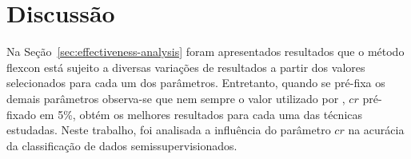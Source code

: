 \section{Discussão}
    \label{sec:discussao}


    Na Seção~\ref{sec:effectiveness-analysis} foram apresentados resultados que o método \ac{flexcon} está sujeito a diversas variações de resultados a partir dos valores selecionados para cada um dos parâmetros. Entretanto, quando se pré\hyp{fixa} os demais parâmetros observa\hyp{se} que nem sempre o valor utilizado por , $cr$ pré\hyp{fixado} em 5\%, obtém os melhores resultados para cada uma das técnicas estudadas. Neste trabalho, foi analisada a influência do parâmetro $cr$ na acurácia da classificação de dados semissupervisionados.